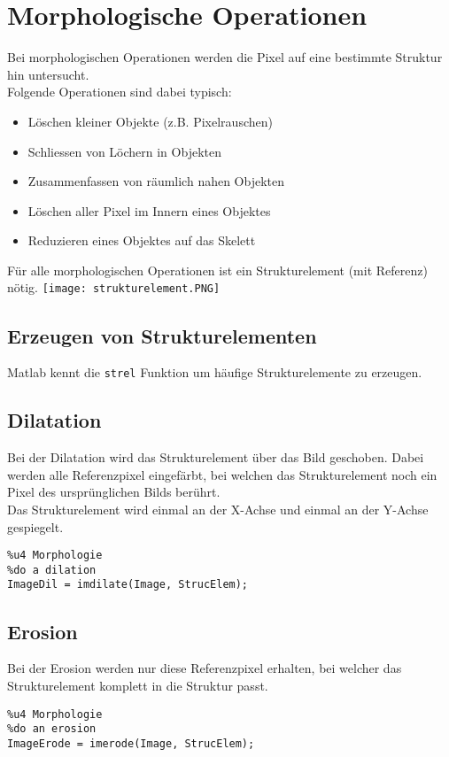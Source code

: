 \section{Morphologische Operationen}
Bei morphologischen Operationen werden die Pixel auf eine bestimmte Struktur hin untersucht.\\
Folgende Operationen sind dabei typisch:
\begin{itemize}
    \item Löschen kleiner Objekte (z.B. Pixelrauschen)
    \item Schliessen von Löchern in Objekten
    \item Zusammenfassen von räumlich nahen Objekten
    \item Löschen aller Pixel im Innern eines Objektes
    \item Reduzieren eines Objektes auf das Skelett
\end{itemize}
Für alle morphologischen Operationen ist ein Strukturelement (mit Referenz) nötig.
\texttt{[image: strukturelement.PNG]}
\subsection{Erzeugen von Strukturelementen}
Matlab kennt die \lstinline{strel} Funktion um häufige Strukturelemente zu erzeugen.

\subsection{Dilatation}
Bei der Dilatation wird das Strukturelement über das Bild geschoben. Dabei werden alle Referenzpixel eingefärbt, bei welchen das Strukturelement noch ein Pixel des ursprünglichen Bilds berührt.\\
Das Strukturelement wird einmal an der X-Achse und einmal an der Y-Achse gespiegelt.
\begin{lstlisting}
%u4 Morphologie
%do a dilation 
ImageDil = imdilate(Image, StrucElem);
\end{lstlisting}

\subsection{Erosion}
Bei der Erosion werden nur diese Referenzpixel erhalten, bei welcher das Strukturelement komplett in die Struktur passt.
\begin{lstlisting}
%u4 Morphologie
%do an erosion 
ImageErode = imerode(Image, StrucElem);
\end{lstlisting}

